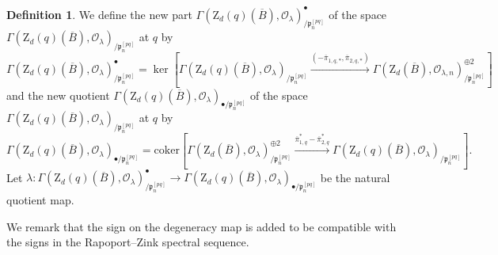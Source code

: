 \documentclass[10pt]{amsart}
\numberwithin{equation}{section}
\theoremstyle{plain}
\numberwithin{equation}{section}
\theoremstyle{definition}
\newtheorem{definition}[theorem]{Definition}
\theoremstyle{remark}
\def\coker{\mathrm{coker}}
\def\calO{\mathcal{O}}
\def\frakp{\mathfrak{p}}
\def\rmZ{\mathrm{Z}}
\begin{document}
\begin{definition}
We define the {new part} $\Gamma(\rmZ_{d}(q)(\overline{B}), \calO_{\lambda})^{\bullet}_{/\frakp^{[pq]}_{n}}$ of the space $\Gamma(\rmZ_{d}(q)(\overline{B}), \calO_{\lambda})_{/\frakp^{[pq]}_{n}}$ at $q$ by
\begin{equation*}
\Gamma(\rmZ_{d}(q)(\overline{B}), \calO_{\lambda})^{\bullet}_{/\frakp^{[pq]}_{n}}=\ker[\Gamma(\rmZ_{d}(q)(\overline{B}), \calO_{\lambda})_{/\frakp^{[pq]}_{n}}\xrightarrow{(-\overline{\pi}_{1,q,\ast},\overline{\pi}_{2,q,\ast})}\Gamma(\rmZ_{d}(\overline{B}), \calO_{\lambda, n})^{\oplus2}_{/\frakp^{[pq]}_{n}}]
\end{equation*}
and the {new quotient} $\Gamma(\rmZ_{d}(q)(\overline{B}), \calO_{\lambda})_{\bullet/\frakp^{[pq]}_{n}}$ of the space $\Gamma(\rmZ_{d}(q)(\overline{B}), \calO_{\lambda})_{/\frakp^{[pq]}_{n}}$ at $q$ by
\begin{equation*}
\Gamma(\rmZ_{d}(q)(\overline{B}), \calO_{\lambda})_{\bullet/\frakp^{[pq]}_{n}}=\coker[\Gamma(\rmZ_{d}(\overline{B}), \calO_{\lambda})^{\oplus2}_{/\frakp^{[pq]}_{n}}\xrightarrow{\overline{\pi}^{\ast}_{1,q}-\overline{\pi}^{\ast}_{2,q}}\Gamma(\rmZ_{d}(q)(\overline{B}), \calO_{\lambda})_{/\frakp^{[pq]}_{n}}].
\end{equation*}
Let $\lambda: \Gamma(\rmZ_{d}(q)(\overline{B}), \calO_{\lambda})^{\bullet}_{/\frakp^{[pq]}_{n}}\rightarrow \Gamma(\rmZ_{d}(q)(\overline{B}), \calO_{\lambda})_{\bullet/\frakp^{[pq]}_{n}}$ be the natural quotient map.
\end{definition}
We remark that the sign on the degeneracy map is added to be compatible with the signs in the  Rapoport--Zink spectral sequence.
\end{document}
